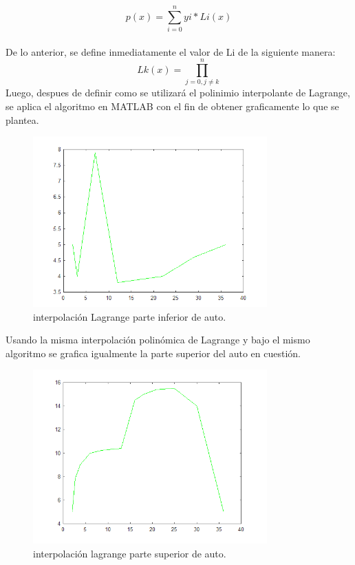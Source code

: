 \documentclass{udpreport}
\begin{document}
\begin{enumerate}
 \begin{equation}
 p(x)=\sum_{i=0}^n yi*Li(x)
\end{equation}
\\ De lo anterior, se define inmediatamente el valor de Li de la siguiente manera:
 \begin{equation}
 Lk(x)=\prod_{j=0,j\not=k}^{n}
\end{equation}
Luego, despues de definir como se utilizará el polinimio interpolante de Lagrange, se aplica el algoritmo en MATLAB con el fin de obtener graficamente lo que se plantea. 
\begin{figure}[H]
    \centering
    \includegraphics[width=9cm]{int_lagrange_inf}
    \caption{interpolación Lagrange parte inferior de auto.} \label{fig:int_lagrange_inf}
\end{figure}
Usando la misma interpolación polinómica de Lagrange y bajo el mismo algoritmo se grafica igualmente la parte superior del auto en cuestión.
\begin{figure}[H]
    \centering
    \includegraphics[width=9cm]{int_lagrange_aprox_parte_sup}
    \caption{interpolación lagrange parte superior de auto.} \label{fig:int_lagrange_aprox_parte_sup}
\end{figure}


\end{enumerate}
\end{document}
